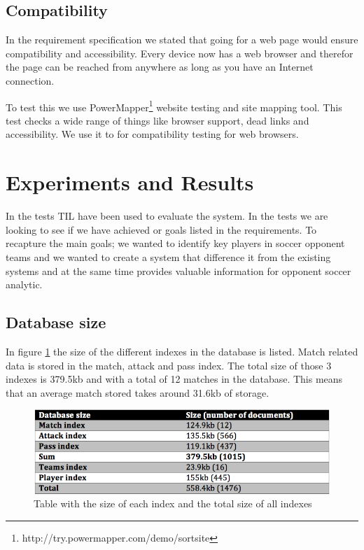 \subsection{Compatibility}

In the requirement specification we stated that going for a web page would ensure compatibility and accessibility. Every device now has a web browser and therefor the page can be reached from anywhere as long as you have an Internet connection. 

To test this we use PowerMapper\footnote{ http://try.powermapper.com/demo/sortsite } website testing and site mapping tool. This test checks a wide range of things like browser support, dead links and accessibility. We use it to for compatibility testing for web browsers.

\section{Experiments and Results}

In the tests \ac{TIL} have been used to evaluate the system. In the tests we are looking to see if we have achieved or goals listed in the requirements. To recapture the main goals; we wanted to identify key players in soccer opponent teams and we wanted to create a system that difference it from the existing systems and at the same time provides valuable information for opponent soccer analytic. 

\subsection{Database size}
In figure \ref{fig:dbsize} the size of the different indexes in the database is listed. Match related data is stored in the match, attack and pass index. The total size of those 3 indexes is 379.5kb and with a total of 12 matches in the database. This means that an average match stored takes around 31.6kb of storage.

\begin{figure}[ht!]
\centering
\includegraphics[width=1\textwidth]{images/evaluation/dbsize}
\caption{Table with the size of each index and the total size of all indexes}
\label{fig:dbsize}
\end{figure}

